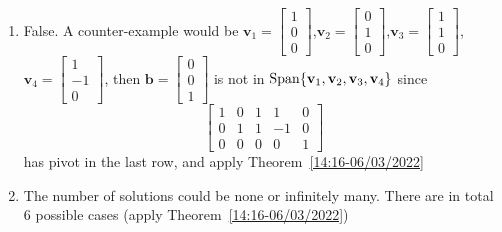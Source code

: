 \documentclass[a4paper,10pt]{article}
\begin{document}
\begin{solution}
\begin{enumerate}
\item False. A counter-example would be $\mathbf v_1=\begin{bmatrix}
1\\0\\0
\end{bmatrix}$,$\mathbf v_2=\begin{bmatrix}
0\\1\\0
\end{bmatrix}$,$\mathbf v_3=\begin{bmatrix}
1\\1\\0
\end{bmatrix}$,$\mathbf v_4=\begin{bmatrix}
1\\-1\\0
\end{bmatrix}$, then $\mathbf b=\begin{bmatrix}
0\\0\\1
\end{bmatrix}$ is not in $\operatorname{Span}\{\mathbf v_1,\mathbf v_2,\mathbf v_3,\mathbf v_4\}$ since
\[
\begin{bmatrix}
1&0&1&1&0\\
0&1&1&-1&0\\
0&0&0&0&1
\end{bmatrix}
\]
has pivot in the last row, and apply Theorem~\ref{14:16-06/03/2022}
\item The number of solutions could be none or infinitely many. There are in total 6 possible cases (apply Theorem~\ref{14:16-06/03/2022})
\end{enumerate}
\end{solution}
\end{document}
